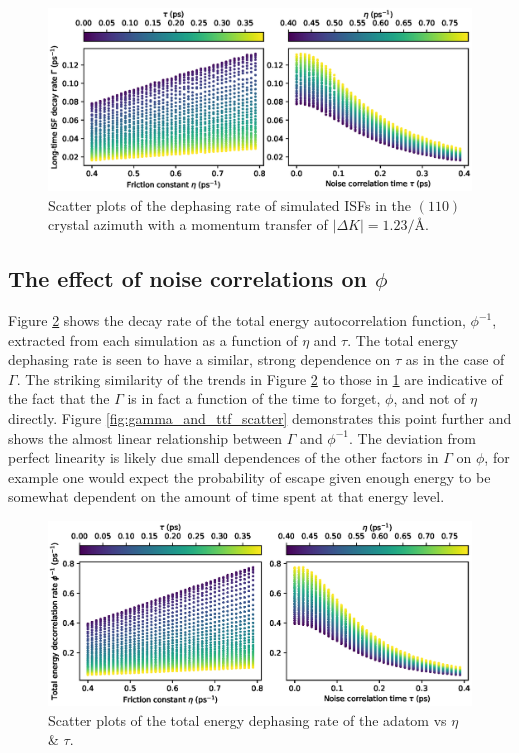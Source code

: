 \documentclass{article}
\newcommand{\iA}{\si{\per\angstrom}}
\begin{document}
\begin{figure}
	\centering
	\includegraphics[width=1.0\textwidth]{eta_tau_gamma}
	\caption{Scatter plots of the dephasing rate of simulated ISFs in the $(110)$ crystal azimuth with a momentum transfer of $\left|\Delta{K}\right|=1.23\iA$.} 
	\label{fig:eta_tau_gamma}
\end{figure}

\subsection{The effect of noise correlations on $\phi$}\label{sec:phi}

Figure \ref{fig:eta_tau_ttf} shows the decay rate of the total energy autocorrelation function, $\phi^{-1}$, extracted from each simulation as a function of $\eta$ and $\tau$. The total energy dephasing rate is seen to have a similar, strong dependence on $\tau$ as in the case of $\Gamma$. The striking similarity of the trends in Figure \ref{fig:eta_tau_ttf} to those in \ref{fig:eta_tau_gamma} are indicative of the fact that the $\Gamma$ is in fact a function of the time to forget, $\phi$, and not of $\eta$ directly. Figure \ref{fig:gamma_and_ttf_scatter} demonstrates this point further and shows the almost linear relationship between $\Gamma$ and $\phi^{-1}$. The deviation from perfect linearity is likely due small dependences of the other factors in $\Gamma$ on $\phi$, for example one would expect the probability of escape given enough energy to be somewhat dependent on the amount of time spent at that energy level. 

\begin{figure}
	\centering
	\includegraphics[width=1.0\textwidth]{eta_tau_ttf}
	\caption{Scatter plots of the total energy dephasing rate of the adatom vs $\eta$ \& $\tau$. } 
	\label{fig:eta_tau_ttf}
\end{figure}
\end{document}
